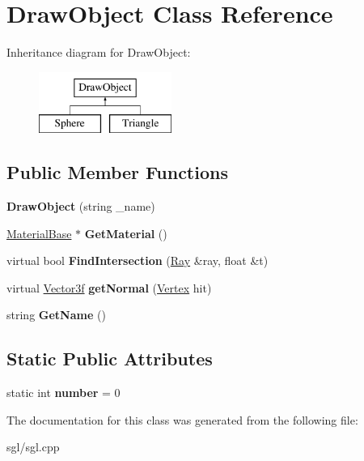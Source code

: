 \hypertarget{class_draw_object}{}\section{Draw\+Object Class Reference}
\label{class_draw_object}
Inheritance diagram for Draw\+Object\+:\begin{figure}[H]
\begin{center}
\leavevmode
\includegraphics[height=2.000000cm]{class_draw_object}
\end{center}
\end{figure}
\subsection*{Public Member Functions}
\begin{DoxyCompactItemize}
\item 
\mbox{\label{class_draw_object_a5dadd2f2acaa0153d5a987ca0774f4d2}} 
{\bfseries Draw\+Object} (string \+\_\+name)
\item 
\mbox{\label{class_draw_object_afc75633fde3afcbdcd8b8b9953826992}} 
\hyperlink{class_material_base}{Material\+Base} $\ast$ {\bfseries Get\+Material} ()
\item 
\mbox{\label{class_draw_object_a00b5eb5fbda278a316839cd38153321d}} 
virtual bool {\bfseries Find\+Intersection} (\hyperlink{class_ray}{Ray} \&ray, float \&t)
\item 
\mbox{\label{class_draw_object_a6851df385d257d299f9d4044e35a72a4}} 
virtual \hyperlink{class_vector3f}{Vector3f} {\bfseries get\+Normal} (\hyperlink{class_vertex}{Vertex} hit)
\item 
\mbox{\label{class_draw_object_a64a6ac1c3b730ad99244e9de160718a3}} 
string {\bfseries Get\+Name} ()
\end{DoxyCompactItemize}
\subsection*{Static Public Attributes}
\begin{DoxyCompactItemize}
\item 
\mbox{\label{class_draw_object_acf2061f9ae139591b6bee389945351bc}} 
static int {\bfseries number} = 0
\end{DoxyCompactItemize}


The documentation for this class was generated from the following file\+:\begin{DoxyCompactItemize}
\item 
sgl/sgl.\+cpp\end{DoxyCompactItemize}
